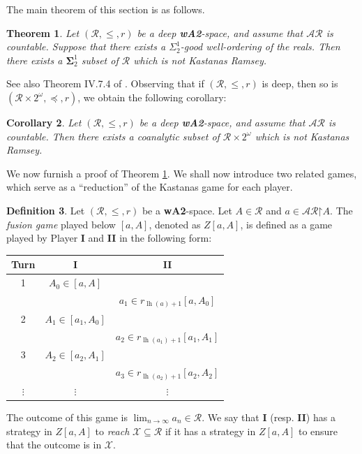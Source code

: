 \documentclass[11pt,reqno]{amsart}
\theoremstyle{plain}
\numberwithin{equation}{section}
\newtheorem{theorem}{Theorem}[section]
\newtheorem{corollary}[theorem]{Corollary}
\theoremstyle{definition}
\newtheorem{definition}[theorem]{Definition}
\newcommand{\func}{\operatorname}
\newcommand{\cal}{\mathcal}
\newcommand{\restrictedto}{\mathord{\upharpoonright}}
\newcommand{\X}{\cal{X}}
\newcommand{\lh}{\func{lh}}
\begin{document}
The main theorem of this section is as follows. 


\begin{theorem}
\label{thm:sigma_1^2.wo.gives.non.kr.set}
    Let $(\cal{R},\leq,r)$ be a deep \textbf{wA2}-space, and assume that $\cal{AR}$ is countable. Suppose that there exists a $\Sigma_2^1$-good well-ordering of the reals. Then there exists a $\mathbf{\Sigma}_2^1$ subset of $\cal{R}$ which is not Kastanas Ramsey.
\end{theorem}


See also Theorem IV.7.4 of \cite{AT05}. Observing that if $(\cal{R},\leq,r)$ is deep, then so is $(\cal{R} \times 2^\omega,\preceq,r)$, we obtain the following corollary:

\begin{corollary}
\label{cor:r.times.2^omega.has.coanalytic.non.kr.set}
    Let $(\cal{R},\leq,r)$ be a deep \textbf{wA2}-space, and assume that $\cal{AR}$ is countable. Then there exists a coanalytic subset of $\cal{R} \times 2^\omega$ which is not Kastanas Ramsey.
\end{corollary}

We now furnish a proof of Theorem \ref{thm:sigma_1^2.wo.gives.non.kr.set}. We shall now introduce two related games, which serve as a ``reduction'' of the Kastanas game for each player.

\begin{definition}
\label{def:fusion.game}
    Let $(\cal{R},\leq,r)$ be a \textbf{wA2}-space. Let $A \in \cal{R}$ and $a \in \cal{AR}\restrictedto A$. The \emph{fusion game} played below $[a,A]$, denoted as $Z[a,A]$, is defined as a game played by Player \textbf{I} and \textbf{II} in the following form:
    \begin{center}
        \begin{tabular}{c|c|c}
           Turn & \textbf{I} & \textbf{II} \\
            \hline
           1 & $A_0 \in [a,A]$ & \\
            & & $a_1 \in r_{\lh(a)+1}[a,A_0]$ \\
            \hline
           2 & $A_1 \in [a_1,A_0]$ & \\
            & & $a_2 \in r_{\lh(a_1)+1}[a_1,A_1]$ \\
            \hline
           3 &  $A_2 \in [a_2,A_1]$ & \\
            & & $a_3 \in r_{\lh(a_2)+1}[a_2,A_2]$ \\
            \hline
            $\vdots$ & $\vdots$ & $\vdots$
        \end{tabular}
    \end{center}
    The outcome of this game is $\lim_{n \to \infty} a_n \in \cal{R}$. We say that \textbf{I} (resp. \textbf{II}) has a strategy in $Z[a,A]$ to \emph{reach} $\X \subseteq \cal{R}$ if it has a strategy in $Z[a,A]$ to ensure that the outcome is in $\X$. 
\end{definition}
\end{document}

